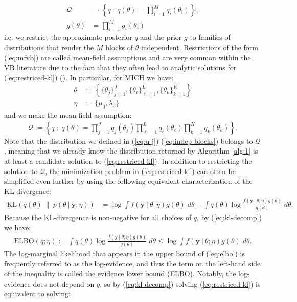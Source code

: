\begin{align} 
    \mathcal{Q} &= \left\{q \::\: q(\theta) = \prod_{i=1}^M q_i(\theta_i)\right\}, \label{eq:mfvb} \\
    g(\theta) &= \prod_{i=1}^M g_i(\theta_i) \label{eq:ind-prior}
\end{align}
i.e. we restrict the approximate posterior $q$ and the prior $g$ to families of distributions that render the $M$ blocks of $\theta$ independent. Restrictions of the form (\ref{eq:mfvb}) are called mean-field assumptions and are very common within the VB literature due to the fact that they often lead to analytic solutions for (\ref{eq:restriced-kl}) (\citealp{Wainright08}). In particular, for MICH we have:
\begin{align}
    \theta &:= \left\{\{\theta_j\}_{j=1}^J, \{\theta_\ell\}_{\ell=1}^L,\{\theta_k\}_{k=1}^K\right\} \\
    \eta &:= \{\mu_0,\lambda_0\}
\end{align}
and we make the mean-field assumption:
\begin{align}
    \mathcal{Q} := \left\{q \;:\; q\left(\theta\right) = \prod_{j=1}^J q_j(\theta_j) \prod_{\ell=1}^L q_\ell(\theta_\ell)\prod_{k=1}^K q_k(\theta_k)\right\}.\label{eq:mean-field}
\end{align}
Note that the distribution we defined in (\ref{eq:q-j})-(\ref{eq:indep-blocks}) belongs to $\mathcal{Q}$, meaning that we already know the distribution returned by Algorithm \ref{alg:1} is at least a candidate solution to (\ref{eq:restriced-kl}). In addition to restricting the solution to $\mathcal{Q}$, the minimization problem in (\ref{eq:restriced-kl}) can often be simplified even further by using the following equivalent characterization of the KL-divergence: 
\begin{align}
     \text{KL}( q(\theta) \:\lVert\: p(\theta\:|\: \mathbf{y};\eta)) &= \log \int f(\mathbf{y}\:|\:\theta;\eta)g(\theta)\;d\theta - \int q(\theta) \log \frac{ f(\mathbf{y}\:|\: \theta;\eta) g(\theta)}{q(\theta)} \; d\theta. \label{eq:kl-decomp} 
\end{align}
Because the KL-divergence is non-negative for all choices of $q$, by (\ref{eq:kl-decomp}) we have:
\begin{align}\label{eq:elbo}
    \text{ELBO}(q;\eta) := \int q(\theta) \log \frac{ f(\mathbf{y}\:|\: \theta;\eta) g(\theta)}{q(\theta)} \; d\theta \leq \log \int f(\mathbf{y}\:|\:\theta;\eta)g(\theta)\;d\theta.
\end{align}
The log-marginal likelihood that appears in the upper bound of (\ref{eq:elbo}) is frequently referred to as the log-evidence, and thus the term on the left-hand side of the inequality is called the evidence lower bound (ELBO). Notably, the log-evidence does not depend on $q$, so by (\ref{eq:kl-decomp}) solving (\ref{eq:restriced-kl}) is equivalent to solving: 
